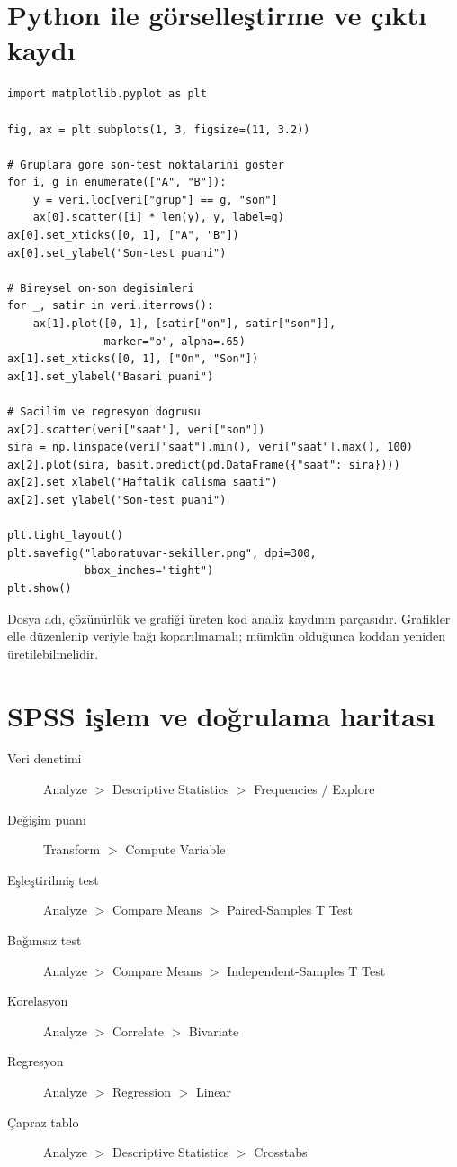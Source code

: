 \section{Python ile görselleştirme ve çıktı kaydı}

\begin{lstlisting}
import matplotlib.pyplot as plt

fig, ax = plt.subplots(1, 3, figsize=(11, 3.2))

# Gruplara gore son-test noktalarini goster
for i, g in enumerate(["A", "B"]):
    y = veri.loc[veri["grup"] == g, "son"]
    ax[0].scatter([i] * len(y), y, label=g)
ax[0].set_xticks([0, 1], ["A", "B"])
ax[0].set_ylabel("Son-test puani")

# Bireysel on-son degisimleri
for _, satir in veri.iterrows():
    ax[1].plot([0, 1], [satir["on"], satir["son"]],
               marker="o", alpha=.65)
ax[1].set_xticks([0, 1], ["On", "Son"])
ax[1].set_ylabel("Basari puani")

# Sacilim ve regresyon dogrusu
ax[2].scatter(veri["saat"], veri["son"])
sira = np.linspace(veri["saat"].min(), veri["saat"].max(), 100)
ax[2].plot(sira, basit.predict(pd.DataFrame({"saat": sira})))
ax[2].set_xlabel("Haftalik calisma saati")
ax[2].set_ylabel("Son-test puani")

plt.tight_layout()
plt.savefig("laboratuvar-sekiller.png", dpi=300,
            bbox_inches="tight")
plt.show()
\end{lstlisting}

Dosya adı, çözünürlük ve grafiği üreten kod analiz kaydının parçasıdır.
Grafikler elle düzenlenip veriyle bağı koparılmamalı; mümkün olduğunca koddan
yeniden üretilebilmelidir.

\section{SPSS işlem ve doğrulama haritası}

\begin{description}
  \item[Veri denetimi] Analyze $>$ Descriptive Statistics $>$ Frequencies / Explore
  \item[Değişim puanı] Transform $>$ Compute Variable
  \item[Eşleştirilmiş test] Analyze $>$ Compare Means $>$ Paired-Samples T Test
  \item[Bağımsız test] Analyze $>$ Compare Means $>$ Independent-Samples T Test
  \item[Korelasyon] Analyze $>$ Correlate $>$ Bivariate
  \item[Regresyon] Analyze $>$ Regression $>$ Linear
  \item[Çapraz tablo] Analyze $>$ Descriptive Statistics $>$ Crosstabs
\end{description}

